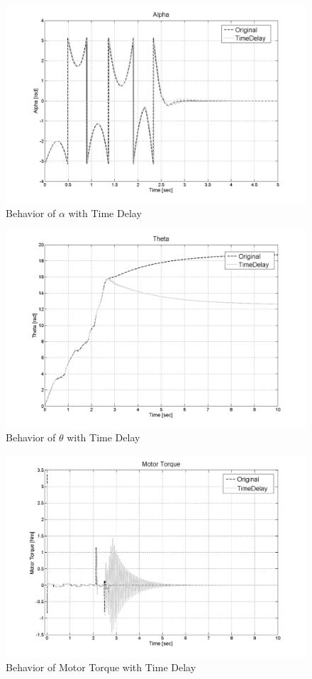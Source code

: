 \documentclass{article}
\theoremstyle{plain}
\theoremstyle{definition}
\theoremstyle{remark}
\begin{document}
\begin{itemize}
\begin{figure}[h]
\includegraphics[width=1\textwidth]{q10_t1.png}
\caption{Behavior of $\alpha$ with Time Delay} \label{tex}
\label{fig:q10_t1}
\end{figure}
\begin{figure}[h]
\includegraphics[width=1\textwidth]{q10_t2.png}
\caption{Behavior of $\theta$ with Time Delay} \label{tex}
\label{fig:q10_t2}
\end{figure}
\begin{figure}[h]
\includegraphics[width=1\textwidth]{q10_t3.png}
\caption{Behavior of Motor Torque with Time Delay} \label{tex}
\label{fig:q10_t3}
\end{figure}
\end{itemize}
\end{document}
